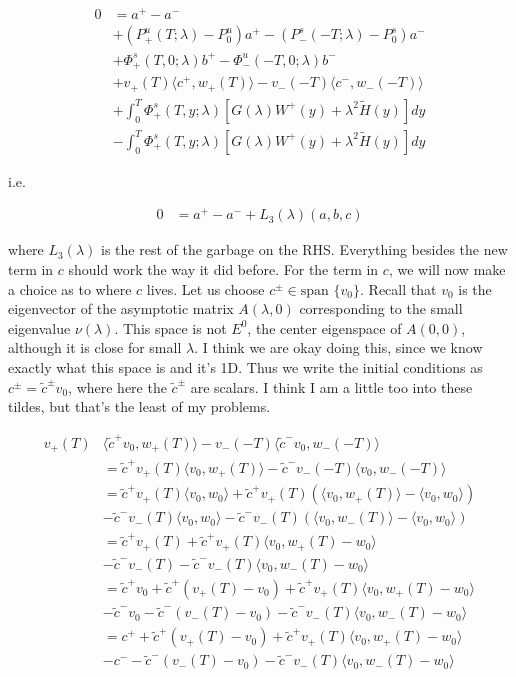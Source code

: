 \documentclass[12pt]{article}
\begin{document}
\begin{enumerate}
\begin{align*}
0 &= a^+ - a^- \\
&+ (P^u_+(T; \lambda) - P_0^u)a^+ - (P^s_-(-T; \lambda) - P_0^s)a^- \\
&+ \Phi^s_+(T, 0; \lambda)b^+ - \Phi^u_-(-T, 0; \lambda)b^- \\
&+ v_+(T) \langle c^+, w_+(T) \rangle - v_-(-T) \langle c^-, w_-(-T) \rangle \\
&+ \int_0^T \Phi^s_+(T, y; \lambda) [ G(\lambda)W^+(y) + \lambda^2 \tilde{H}(y) ] dy \\
&- \int_0^T \Phi^s_+(T, y; \lambda) [ G(\lambda)W^+(y) + \lambda^2 \tilde{H}(y) ] dy
\end{align*}

i.e. 

\begin{align*}
0 &= a^+ - a^- + L_3(\lambda)(a, b,c)
\end{align*}

where $L_3(\lambda)$ is the rest of the garbage on the RHS. Everything besides the new term in $c$ should work the way it did before. For the term in $c$, we will now make a choice as to where $c$ lives. Let us choose $c^\pm \in \text{span }\{v_0\}$. Recall that $v_0$ is the eigenvector of the asymptotic matrix $A(\lambda, 0)$ corresponding to the small eigenvalue $\nu(\lambda)$. This space is not $E^0$, the center eigenspace of $A(0, 0)$, although it is close for small $\lambda$. I think we are okay doing this, since we know exactly what this space is and it's 1D. Thus we write the initial conditions as $c^\pm = \tilde{c}^\pm v_0$, where here the $\tilde{c}^\pm$ are scalars. I think I am a little too into these tildes, but that's the least of my problems.

\begin{align*}
v_+(T) &\langle \tilde{c}^+ v_0, w_+(T) \rangle - v_-(-T) \langle \tilde{c}^- v_0, w_-(-T) \rangle \\
&= \tilde{c}^+ v_+(T)\langle v_0, w_+(T) \rangle - \tilde{c}^- v_-(-T) \langle  v_0, w_-(-T) \rangle \\
&= \tilde{c}^+ v_+(T)\langle v_0, w_0 \rangle + \tilde{c}^+ v_+(T)( \langle v_0, w_+(T) \rangle - \langle v_0, w_0 \rangle )\\
&- \tilde{c}^- v_-(T)\langle v_0, w_0 \rangle - \tilde{c}^- v_-(T)( \langle v_0, w_-(T) \rangle - \langle v_0, w_0 \rangle )\\
&= \tilde{c}^+ v_+(T) + \tilde{c}^+ v_+(T) \langle v_0, w_+(T) - w_0 \rangle \\
&- \tilde{c}^- v_-(T) - \tilde{c}^- v_-(T) \langle v_0, w_-(T) - w_0 \rangle \\
&= \tilde{c}^+ v_0 + \tilde{c}^+( v_+(T) - v_0) + \tilde{c}^+ v_+(T) \langle v_0, w_+(T) - w_0 \rangle \\
&- \tilde{c}^- v_0 - \tilde{c}^-( v_-(T) - v_0) - \tilde{c}^- v_-(T) \langle v_0, w_-(T) - w_0 \rangle \\
&= c^+ + \tilde{c}^+( v_+(T) - v_0) + \tilde{c}^+ v_+(T) \langle v_0, w_+(T) - w_0 \rangle \\
&- c^- - \tilde{c}^-( v_-(T) - v_0) - \tilde{c}^- v_-(T) \langle v_0, w_-(T) - w_0 \rangle \\
\end{align*}


\end{enumerate}
\end{document}
